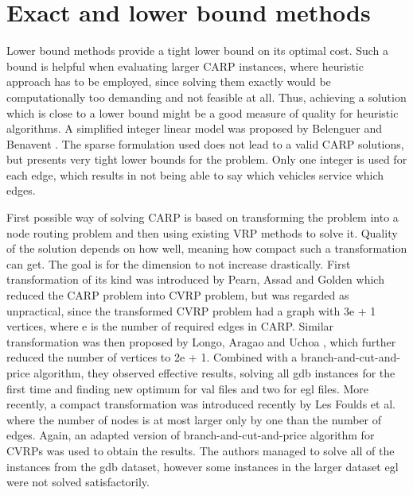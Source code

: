 \documentclass[twoside]{ctuthesis}
\theoremstyle{plain}
\theoremstyle{definition}
\theoremstyle{note}
\begin{document}
\section{Exact and lower bound methods}
Lower bound methods provide a tight lower bound on its optimal cost. Such a bound is helpful when evaluating larger CARP instances, where heuristic approach has to be employed, since solving them exactly would be computationally too demanding and not feasible at all. Thus, achieving a solution which is close to a lower bound might be a good measure of quality for heuristic algorithms.
A simplified integer linear model was proposed by Belenguer and Benavent \cite{BELENGUER2003705}. The sparse formulation used does not lead to a valid CARP solutions, but presents very tight lower bounds for the problem. Only one integer is used for each edge, which results in not being able to say which vehicles service which edges.

First possible way of solving CARP is based on transforming the problem into a node routing problem and then using existing VRP methods to solve it. Quality of the solution depends on how well, meaning how compact such a transformation can get. The goal is for the dimension to not increase drastically.
First transformation of its kind was introduced by Pearn, Assad and Golden \cite{PEARN1987285} which reduced the CARP problem into CVRP problem, but was regarded as unpractical, since the transformed CVRP problem had a graph with 3e + 1 vertices, where e is the number of required edges in CARP. Similar transformation was then proposed by Longo, Aragao and Uchoa \cite{LONGO20061823}, which further reduced the number of vertices to 2e + 1. Combined with a branch-and-cut-and-price algorithm, they observed effective results, solving all gdb instances for the first time and finding new optimum for val files and two for egl files.
More recently, a compact transformation was introduced recently by Les Foulds et al. \cite{foulds2015compact} where the number of nodes is at most larger only by one than the number of edges. Again, an adapted version of branch-and-cut-and-price algorithm for CVRPs was used to obtain the results. The authors managed to solve all of the instances from the gdb dataset, however some instances in the larger dataset egl were not solved satisfactorily.
\end{document}
